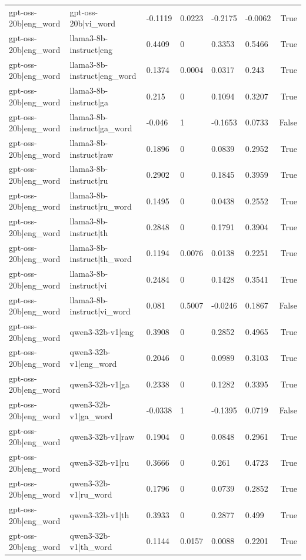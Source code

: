 \begin{table}
\begin{tabular}{llllllr}
gpt-oss-20b|eng_word & gpt-oss-20b|vi_word & -0.1119 & 0.0223 & -0.2175 & -0.0062 & True \\
gpt-oss-20b|eng_word & llama3-8b-instruct|eng & 0.4409 & 0 & 0.3353 & 0.5466 & True \\
gpt-oss-20b|eng_word & llama3-8b-instruct|eng_word & 0.1374 & 0.0004 & 0.0317 & 0.243 & True \\
gpt-oss-20b|eng_word & llama3-8b-instruct|ga & 0.215 & 0 & 0.1094 & 0.3207 & True \\
gpt-oss-20b|eng_word & llama3-8b-instruct|ga_word & -0.046 & 1 & -0.1653 & 0.0733 & False \\
gpt-oss-20b|eng_word & llama3-8b-instruct|raw & 0.1896 & 0 & 0.0839 & 0.2952 & True \\
gpt-oss-20b|eng_word & llama3-8b-instruct|ru & 0.2902 & 0 & 0.1845 & 0.3959 & True \\
gpt-oss-20b|eng_word & llama3-8b-instruct|ru_word & 0.1495 & 0 & 0.0438 & 0.2552 & True \\
gpt-oss-20b|eng_word & llama3-8b-instruct|th & 0.2848 & 0 & 0.1791 & 0.3904 & True \\
gpt-oss-20b|eng_word & llama3-8b-instruct|th_word & 0.1194 & 0.0076 & 0.0138 & 0.2251 & True \\
gpt-oss-20b|eng_word & llama3-8b-instruct|vi & 0.2484 & 0 & 0.1428 & 0.3541 & True \\
gpt-oss-20b|eng_word & llama3-8b-instruct|vi_word & 0.081 & 0.5007 & -0.0246 & 0.1867 & False \\
gpt-oss-20b|eng_word & qwen3-32b-v1|eng & 0.3908 & 0 & 0.2852 & 0.4965 & True \\
gpt-oss-20b|eng_word & qwen3-32b-v1|eng_word & 0.2046 & 0 & 0.0989 & 0.3103 & True \\
gpt-oss-20b|eng_word & qwen3-32b-v1|ga & 0.2338 & 0 & 0.1282 & 0.3395 & True \\
gpt-oss-20b|eng_word & qwen3-32b-v1|ga_word & -0.0338 & 1 & -0.1395 & 0.0719 & False \\
gpt-oss-20b|eng_word & qwen3-32b-v1|raw & 0.1904 & 0 & 0.0848 & 0.2961 & True \\
gpt-oss-20b|eng_word & qwen3-32b-v1|ru & 0.3666 & 0 & 0.261 & 0.4723 & True \\
gpt-oss-20b|eng_word & qwen3-32b-v1|ru_word & 0.1796 & 0 & 0.0739 & 0.2852 & True \\
gpt-oss-20b|eng_word & qwen3-32b-v1|th & 0.3933 & 0 & 0.2877 & 0.499 & True \\
gpt-oss-20b|eng_word & qwen3-32b-v1|th_word & 0.1144 & 0.0157 & 0.0088 & 0.2201 & True \\

\end{tabular}
\end{table}
